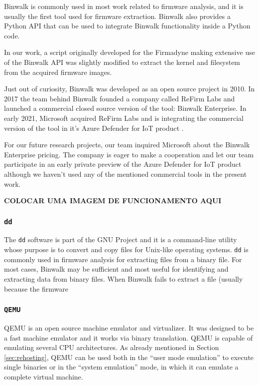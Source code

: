 Binwalk is commonly used in most work related to firmware analysis, and it is usually the first tool used for firmware extraction. Binwalk also provides a Python API that can be used to integrate Binwalk functionality inside a Python code.

In our work, a script originally developed for the Firmadyne \cite{firmadyne} making extensive use of the Binwalk API was slightly modified to extract the kernel and filesystem from the acquired firmware images.

Just out of curiosity, Binwalk was developed as an open source project in 2010. In 2017 the team behind Binwalk founded a company called ReFirm Labs and launched a commercial closed source version of the tool: Binwalk Enterprise. In early 2021, Microsoft acquired ReFirm Labs and is integrating the commercial version of the tool in it's Azure Defender for IoT product \cite{microsoft-refirmlabs}.

For our future research projects, our team inquired Microsoft about the Binwalk Enterprise pricing. The company is eager to make a cooperation and let our team participate in an early private preview of the Azure Defender for IoT product although we haven't used any of the mentioned commercial tools in the present work.

\textbf{COLOCAR UMA IMAGEM DE FUNCIONAMENTO AQUI}

\subsubsection{ {\tt dd} }

The {\tt dd} software is part of the GNU Project and it is a command-line utility whose purpose is to convert and copy files for Unix-like operating systems. {\tt dd} is commonly used in firmware analysis for extracting files from a binary file. For most cases, Binwalk may be sufficient and most useful for identifying and extracting data from binary files. When Binwalk fails to extract a file (usually because the firmware 

\subsubsection{ {\tt QEMU} }
\label{sec:qemu}

QEMU \cite{qemu} is an open source machine emulator and virtualizer. It was designed to be a fast machine emulator and it works via binary translation. QEMU is capable of emulating several CPU architectures. As already mentioned in Section \ref{sec:rehosting}, QEMU can be used both in the ``user mode emulation'' to execute single binaries or in the ``system emulation'' mode, in which it can emulate a complete virtual machine.

